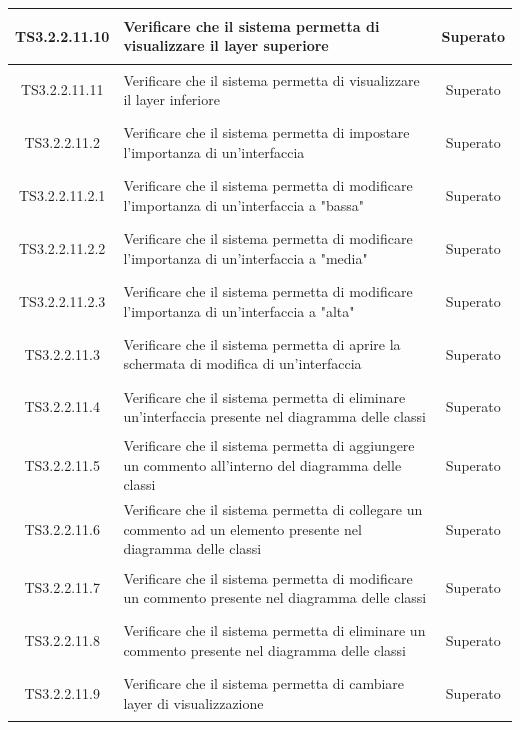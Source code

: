 \documentclass[../PianoDiQualifica.tex]{subfiles}
\begin{document}
\begin{longtable}{|c|>{\centering}p{10cm}|c|}
	\hline
	\hypertarget{TS3.2.2.11.10}{TS3.2.2.11.10} & Verificare che il sistema permetta di visualizzare il layer superiore & Superato \\
	\hline
	\hypertarget{TS3.2.2.11.11}{TS3.2.2.11.11} & Verificare che il sistema permetta di visualizzare il layer inferiore & Superato \\
	\hline
	\hypertarget{TS3.2.2.11.2}{TS3.2.2.11.2} & Verificare che il sistema permetta di impostare l'importanza di un'interfaccia & Superato \\
	\hline
	\hypertarget{TS3.2.2.11.2.1}{TS3.2.2.11.2.1} & Verificare che il sistema permetta di modificare l'importanza di un'interfaccia a "bassa" & Superato \\
	\hline
	\hypertarget{TS3.2.2.11.2.2}{TS3.2.2.11.2.2} & Verificare che il sistema permetta di modificare l'importanza di un'interfaccia a "media" & Superato\\
	\hline
	\hypertarget{TS3.2.2.11.2.3}{TS3.2.2.11.2.3} & Verificare che il sistema permetta di modificare l'importanza di un'interfaccia a "alta" & Superato \\
	\hline
	\hypertarget{TS3.2.2.11.3}{TS3.2.2.11.3} & Verificare che il sistema permetta di aprire la schermata di modifica di un'interfaccia & Superato \\
	\hline
	\hypertarget{TS3.2.2.11.4}{TS3.2.2.11.4} & Verificare che il sistema permetta di eliminare un'interfaccia presente nel diagramma delle classi & Superato \\
	\hline
	\hypertarget{TS3.2.2.11.5}{TS3.2.2.11.5} & Verificare che il sistema permetta di aggiungere un commento all'interno del diagramma delle classi & Superato\\
	\hline
	\hypertarget{TS3.2.2.11.6}{TS3.2.2.11.6} & Verificare che il sistema permetta di collegare un commento ad un elemento presente nel diagramma delle classi & Superato \\
	\hline
	\hypertarget{TS3.2.2.11.7}{TS3.2.2.11.7} & Verificare che il sistema permetta di modificare un commento presente nel diagramma delle classi & Superato \\
	\hline
	\hypertarget{TS3.2.2.11.8}{TS3.2.2.11.8} & Verificare che il sistema permetta di eliminare un commento presente nel diagramma delle classi & Superato\\
	\hline
	\hypertarget{TS3.2.2.11.9}{TS3.2.2.11.9} & Verificare che il sistema permetta di cambiare layer di visualizzazione & Superato \\

\end{longtable}
\end{document}
